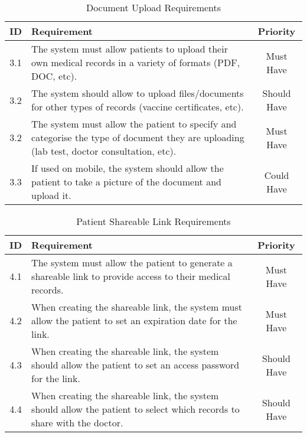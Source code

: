 \begin{table}[h!]
    \centering
    \begin{tabular}{|c|p{10cm}|c|}
    \hline
    \textbf{ID}  & \textbf{Requirement}  & \textbf{Priority} \\ \hline
    3.1  & The system must allow patients to upload their own medical records in a variety of formats (PDF, DOC, etc). & Must Have \\ \hline
    3.2 & The system should allow to upload files/documents for other types of records (vaccine certificates, etc). & Should Have \\ \hline
    3.2  & The system must allow the patient to specify and categorise the type of document they are uploading (lab test, doctor consultation, etc). & Must Have \\ \hline
    3.3  & If used on mobile, the system should allow the patient to take a picture of the document and upload it. & Could Have \\ \hline
    \end{tabular}
    \caption{Document Upload Requirements}
\end{table}

\begin{table}[h!]
    \centering
    \begin{tabular}{|c|p{10cm}|c|}
    \hline
    \textbf{ID}  & \textbf{Requirement}  & \textbf{Priority} \\ \hline
    4.1  & The system must allow the patient to generate a shareable link to provide access to their medical records. & Must Have \\ \hline
    4.2  & When creating the shareable link, the system must allow the patient to set an expiration date for the link. & Must Have \\ \hline
    4.3  & When creating the shareable link, the system should allow the patient to set an access password for the link. & Should Have \\ \hline
    4.4  & When creating the shareable link, the system should allow the patient to select which records to share with the doctor. & Should Have \\ \hline
    \end{tabular}
    \caption{Patient Shareable Link Requirements}
\end{table}

